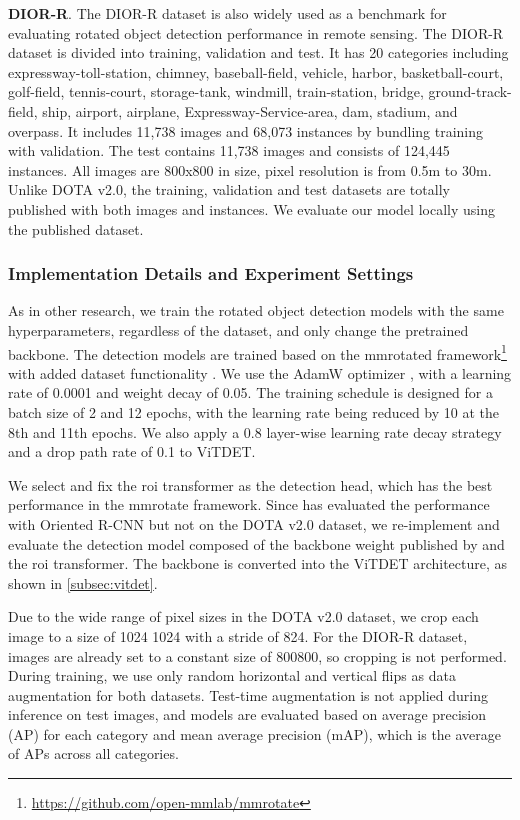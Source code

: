 \textbf{DIOR-R}.  The DIOR-R dataset is also widely used as a benchmark for evaluating rotated object detection performance in remote sensing. The DIOR-R dataset is divided into training, validation and test. It has 20 categories including expressway-toll-station, chimney, baseball-field, vehicle, harbor, basketball-court, golf-field, tennis-court, storage-tank, windmill, train-station, bridge, ground-track-field, ship, airport, airplane, Expressway-Service-area, dam, stadium, and overpass. It includes 11,738 images and 68,073 instances by bundling training with validation. The test contains 11,738 images and consists of 124,445 instances. All images are 800x800 in size, pixel resolution is from 0.5m to 30m. Unlike DOTA v2.0, the training, validation and test datasets are totally published with both images and instances. We evaluate our model locally using the published dataset.

\subsubsection{Implementation Details and Experiment Settings}

As in other research, we train the rotated object detection models with the same hyperparameters, regardless of the dataset, and only change the pretrained backbone. The detection models are trained based on the mmrotated framework\footnote{\url{https://github.com/open-mmlab/mmrotate}} with added dataset functionality \cite{zhou2022mmrotate}. We use the AdamW optimizer \cite{loshchilov2017decoupled}, with a learning rate of 0.0001 and weight decay of 0.05. The training schedule is designed for a batch size of 2 and 12 epochs, with the learning rate being reduced by 10 at the 8th and 11th epochs. We also apply a 0.8 layer-wise learning rate decay strategy and a drop path rate of 0.1 to ViTDET.

We select and fix the roi transformer \cite{ding2019learning} as the detection head, which has the best performance in the mmrotate framework. Since \cite{wang2022advancing} has evaluated the performance with Oriented R-CNN \cite{xie2021oriented} but not on the DOTA v2.0 dataset, we re-implement and evaluate the detection model composed of the backbone weight published by \cite{wang2022advancing} and the roi transformer. The backbone is converted into the ViTDET architecture, as shown in \autoref{subsec:vitdet}.

Due to the wide range of pixel sizes in the DOTA v2.0 dataset, we crop each image to a size of 1024  1024 with a stride of 824. For the DIOR-R dataset, images are already set to a constant size of 800800, so cropping is not performed. During training, we use only random horizontal and vertical flips as data augmentation for both datasets. Test-time augmentation is not applied during inference on test images, and models are evaluated based on average precision (AP) for each category and mean average precision (mAP), which is the average of APs across all categories.


